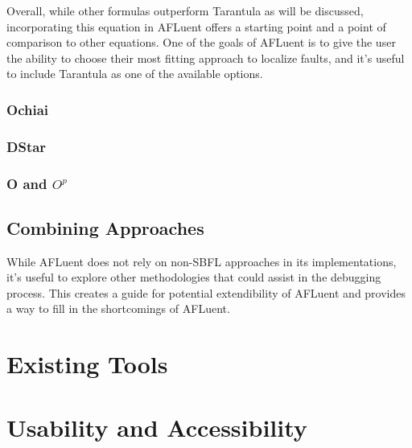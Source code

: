 Overall, while other formulas outperform Tarantula as will be discussed,
incorporating this equation in AFLuent offers a starting point and a point of
comparison to other equations. One of the goals of AFLuent is to give the user
the ability to choose their most fitting approach to localize faults, and it's
useful to include Tarantula as one of the available options.

\subsubsection{Ochiai}
\label{subsubsec:ochiai_lit}

\subsubsection{DStar}
\label{subsubsec:dstar_lit}

\subsubsection{O and \textbf{$O^p$}}
\label{subsubsec:o_lit}

\subsection{Combining Approaches}
\label{subsec:combining_approaches}

While AFLuent does not rely on non-SBFL approaches in its implementations, it's
useful to explore other methodologies that could assist in the debugging
process. This creates a guide for potential extendibility of AFLuent and
provides a way to fill in the shortcomings of AFLuent.

\section{Existing Tools}
\label{sec:existing_tools}

\section{Usability and Accessibility}
\label{sec:usability_accessibility}

